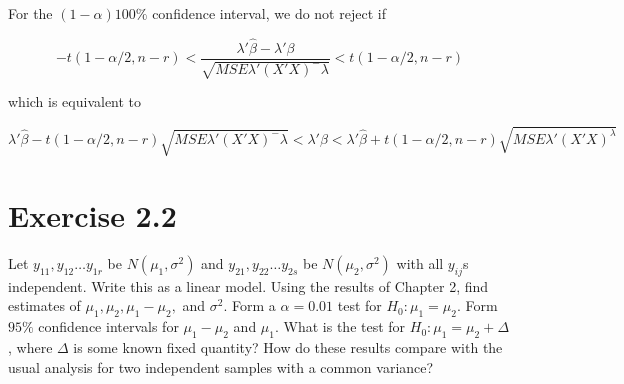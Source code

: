 \documentclass{article}
\begin{document}
For the $(1-\alpha)100\%$ confidence interval, we do not reject if

\[
-t(1-\alpha/2, n-r) < \frac{\lambda'\hat{\beta} - \lambda'\beta}{
\sqrt{MSE\lambda'(X'X)^-\lambda}
} < t(1-\alpha/2, n-r)
\]

which is equivalent to

\[
\lambda'\hat{\beta} - t(1-\alpha/2, n-r)\sqrt{MSE\lambda'(X'X)^-\lambda} < \lambda'\beta < \lambda'\hat{\beta} + t(1-\alpha/2, n-r)\sqrt{MSE\lambda'(X'X)^\lambda}
\]

\section*{Exercise 2.2}
Let $y_{11}, y_{12} \dots y_{1r}$ be $N(\mu_1, \sigma^2)$ and $y_{21}, y_{22} \dots y_{2s}$ be $N(\mu_2, \sigma^2)$ with all $y_{ij}$s independent. Write this as a linear model. Using the results of Chapter 2, find estimates of $\mu_1, \mu_2, \mu_1-\mu_2,$ and $\sigma^2$. Form a $\alpha = 0.01$ test for $H_0:\mu_1 = \mu_2$. Form $95\%$ confidence intervals for $\mu_1-\mu_2$ and $\mu_1$. What is the test for $H_0: \mu_1 = \mu_2 + \Delta$, where $\Delta$ is some known fixed quantity? How do these results compare with the usual analysis for two independent samples with a common variance?
\end{document}
